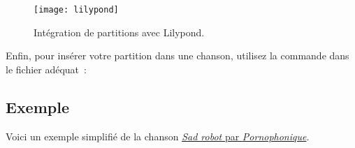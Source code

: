 \begin{figure}
  \begin{minipage}[b]{\linewidth}
    \centering
    \texttt{[image: lilypond]}
    \vspace{0.5cm}
  \end{minipage}

  \begin{minipage}[b]{\linewidth}
  \end{minipage}
  \caption{Intégration de partitions avec Lilypond.}
  \label{fig:lilypond}
\end{figure}

Enfin, pour insérer votre partition  dans une
chanson, utilisez la commande  dans le fichier
 adéquat~:

\begin{song}
\end{song}

\newpage
\subsection{Exemple}

Voici un exemple simplifié de la chanson
\href{http://www.jamendo.com/fr/track/81740}{\emph{Sad robot} par
  \emph{Pornophonique}}.

